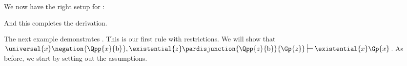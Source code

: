 We now have the right setup for :
\begin{gproof}[\label{GQDExampleG}]
\end{gproof}
And this completes the derivation. 

The next example demonstrates . 
This is our first rule with restrictions.
We will show that $\universal{\variable{x}}\negation{\Qpp{\variable{x}}{\constant{b}}},\existential{\variable{z}}\pardisjunction{\Qpp{\variable{z}}{\constant{b}}}{\Gp{\variable{z}}}\sststile{}{}\existential{\variable{x}}\Gp{\variable{x}}$.
As before, we start by setting out the assumptions. 
\begin{gproof}[\label{GQDExampleH}]
\end{gproof}

